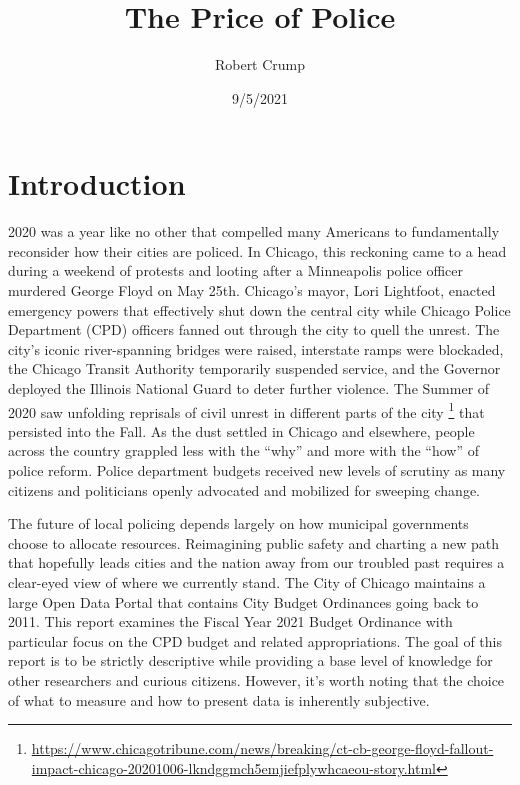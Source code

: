 \documentclass[
]{article}
\title{The Price of Police}
\author{Robert Crump}
\date{9/5/2021}
\begin{document}
\maketitle

\hypertarget{introduction}{%
\section{Introduction}\label{introduction}}

2020 was a year like no other that compelled many Americans to
fundamentally reconsider how their cities are policed. In Chicago, this
reckoning came to a head during a weekend of protests and looting after
a Minneapolis police officer murdered George Floyd on May 25th.
Chicago's mayor, Lori Lightfoot, enacted emergency powers that
effectively shut down the central city while Chicago Police Department
(CPD) officers fanned out through the city to quell the unrest. The
city's iconic river-spanning bridges were raised, interstate ramps were
blockaded, the Chicago Transit Authority temporarily suspended service,
and the Governor deployed the Illinois National Guard to deter further
violence. The Summer of 2020 saw unfolding reprisals of civil unrest in
different parts of the city \footnote{\url{https://www.chicagotribune.com/news/breaking/ct-cb-george-floyd-fallout-impact-chicago-20201006-lkndggmch5emjiefplywhcaeou-story.html}}
that persisted into the Fall. As the dust settled in Chicago and
elsewhere, people across the country grappled less with the ``why'' and
more with the ``how'' of police reform. Police department budgets
received new levels of scrutiny as many citizens and politicians openly
advocated and mobilized for sweeping change.

The future of local policing depends largely on how municipal
governments choose to allocate resources. Reimagining public safety and
charting a new path that hopefully leads cities and the nation away from
our troubled past requires a clear-eyed view of where we currently
stand. The City of Chicago maintains a large Open Data Portal that
contains City Budget Ordinances going back to 2011. This report examines
the Fiscal Year 2021 Budget Ordinance with particular focus on the CPD
budget and related appropriations. The goal of this report is to be
strictly descriptive while providing a base level of knowledge for other
researchers and curious citizens. However, it's worth noting that the
choice of what to measure and how to present data is inherently
subjective.
\end{document}
